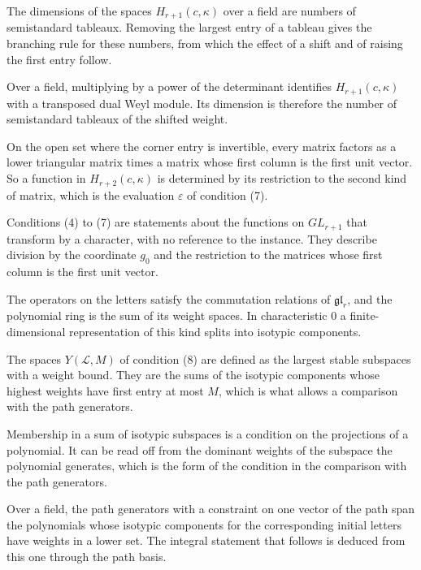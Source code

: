 The dimensions of the spaces $H_{r+1}(c,\kappa)$ over a field are numbers of semistandard tableaux. Removing
the largest entry of a tableau gives the branching rule for these numbers, from which the effect of a shift
and of raising the first entry follow.

Over a field, multiplying by a power of the determinant identifies $H_{r+1}(c,\kappa)$ with a transposed dual
Weyl module. Its dimension is therefore the number of semistandard tableaux of the shifted weight.

On the open set where the corner entry is invertible, every matrix factors as a lower triangular matrix
times a matrix whose first column is the first unit vector. So a function in $H_{r+2}(c,\kappa)$ is
determined by its restriction to the second kind of matrix, which is the evaluation $\varepsilon$ of
condition (7).

Conditions (4) to (7) are statements about the functions on $GL_{r+1}$ that transform by a character,
with no reference to the instance. They describe division by the coordinate $g_0$ and the restriction to
the matrices whose first column is the first unit vector.

The operators on the letters satisfy the commutation relations of $\mathfrak{gl}_r$, and the polynomial
ring is the sum of its weight spaces. In characteristic $0$ a finite-dimensional representation of this
kind splits into isotypic components.

The spaces $Y(\mathcal L,M)$ of condition (8) are defined as the largest stable subspaces with a weight
bound. They are the sums of the isotypic components whose highest weights have first entry at most $M$,
which is what allows a comparison with the path generators.

Membership in a sum of isotypic subspaces is a condition on the projections of a polynomial. It can be read
off from the dominant weights of the subspace the polynomial generates, which is the form of the condition in
the comparison with the path generators.

Over a field, the path generators with a constraint on one vector of the path span the polynomials whose
isotypic components for the corresponding initial letters have weights in a lower set. The integral
statement that follows is deduced from this one through the path basis.

